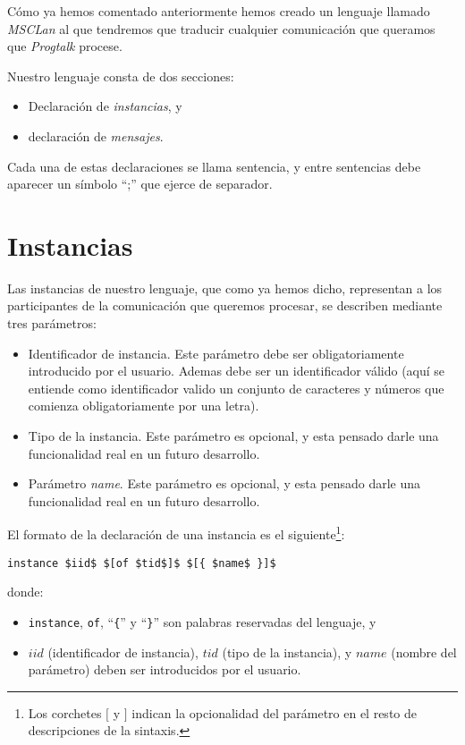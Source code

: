 Cómo ya hemos comentado anteriormente hemos creado un lenguaje llamado
\textit{MSCLan} al que tendremos que traducir cualquier comunicación
que queramos que \textit{Progtalk} procese.

Nuestro lenguaje consta de dos secciones:
\begin{itemize}
\item Declaración de \textit{instancias}, y
\item declaración de \textit{mensajes}.
\end{itemize}

Cada una de estas declaraciones se llama sentencia, y entre sentencias
debe aparecer un símbolo ``;'' que ejerce de separador.

\section{Instancias}\label{sec:Instancias}

Las instancias de nuestro lenguaje, que como ya hemos dicho,
representan a los participantes de la comunicación que queremos
procesar, se describen mediante tres
parámetros:

\begin{itemize}
\item Identificador de instancia. Este parámetro debe ser
  obligatoriamente introducido por el usuario. Ademas debe ser un
  identificador válido (aquí se entiende como identificador valido un
  conjunto de caracteres y números que comienza obligatoriamente por
  una letra).
\item Tipo de la instancia. Este parámetro es opcional, y esta pensado
  darle una funcionalidad real en un futuro desarrollo.
\item Parámetro \textit{name}. Este parámetro es opcional, y esta
  pensado darle una funcionalidad real en un futuro desarrollo.
\end{itemize}

El formato de la declaración de una instancia es el
siguiente\footnote{Los corchetes $[$ y $]$ indican la opcionalidad del
  parámetro en el resto de descripciones de la sintaxis.}:
\begin{center}
  \begin{minipage}{0.40\linewidth}
\begin{lstlisting}[mathescape]
instance $iid$ $[of $tid$]$ $[{ $name$ }]$
\end{lstlisting}
  \end{minipage}
\end{center}
donde:
\begin{itemize}
\item \lstinline{instance}, \lstinline{of}, ``\lstinline!{!'' y
    ``\lstinline!}!'' son palabras reservadas del lenguaje, y
\item $iid$ (identificador de instancia), $tid$ (tipo de la
  instancia), y $name$ (nombre del parámetro) deben ser introducidos
  por el usuario.
\end{itemize}


